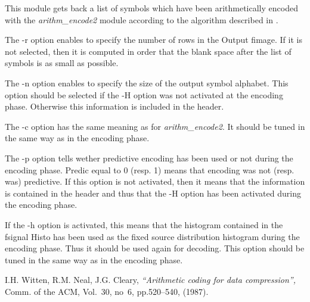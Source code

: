 This module gets back a list of symbols which have been arithmetically encoded 
with the {\em arithm\_encode2} module according to the algorithm 
described in \cite{kn:wnc}. 

The -r option enables to specify the number of rows in the Output fimage. 
If it is not selected, then it is computed in order that the 
blank space after the list of symbols is as small as possible. 

The -n option enables to specify the size of the output symbol alphabet. 
This option should be selected if the -H option was not activated 
at the encoding phase. Otherwise this information is included in the header. 

The -c option has the same meaning as for {\em arithm\_encode2}. 
It should be tuned in the same way as in the encoding phase. 

The -p option tells wether predictive encoding has been used or not 
during the encoding phase. Predic equal to 0 (resp. 1) means that encoding 
was not (resp. was) predictive. If this option is not activated, 
then it means that the information is contained in the header and thus 
that the -H option has been activated during the encoding phase. 

If the -h option is activated, this means that the histogram contained 
in the fsignal Histo has been used as the fixed source distribution histogram 
during the encoding phase. Thus it should be used again for decoding.  
This option should be tuned in the same way as in the encoding phase. 


\begin{thebibliography}{999999}

 I.H. Witten, R.M. Neal, J.G. Cleary, {\em ``Arithmetic 
coding for data compression'', } Comm. of the ACM, Vol.~30, no~6, pp.520--540, 
(1987). 

\end{thebibliography}
